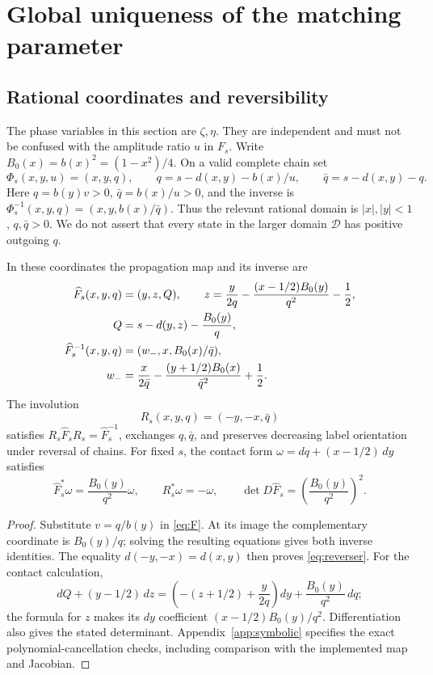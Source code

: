 \section{Global uniqueness of the matching parameter}\label{sec:uniqueness}
\subsection{Rational coordinates and reversibility}
The phase variables in this section are \(\zeta,\eta\). They are independent
and must not be confused with the amplitude ratio \(u\) in \(F_s\).
Write \(B_0(x)=b(x)^2=(1-x^2)/4\). On a valid complete chain set
\begin{equation}\label{eq:Phi}
 \Phi_s(x,y,u)=(x,y,q),\qquad
 q=s-d(x,y)-b(x)/u,\qquad \bar q=s-d(x,y)-q.
\end{equation}
Here \(q=b(y)v>0\), \(\bar q=b(x)/u>0\), and the inverse is
\(\Phi_s^{-1}(x,y,q)=(x,y,b(x)/\bar q)\).
Thus the relevant rational domain is \(|x|,|y|<1\), \(q,\bar q>0\).
We do not assert that every state in the larger domain \(\mathcal D\)
has positive outgoing \(q\).

\begin{lemma}\label{lem:rational}
In these coordinates the propagation map and its inverse are
\begin{align}
 \widehat F_s(x,y,q)&=(y,z,Q),\qquad
 z=\frac{y}{2q}-\frac{(x-1/2)B_0(y)}{q^2}-\frac12,\label{eq:Fhat}\\
 Q&=s-d(y,z)-\frac{B_0(y)}q,\notag\\
 \widehat F_s^{-1}(x,y,q)&=(w_-,x,B_0(x)/\bar q),\notag\\
 w_-&=\frac{x}{2\bar q}
       -\frac{(y+1/2)B_0(x)}{\bar q^2}+\frac12.\notag
\end{align}
The involution
\begin{equation}\label{eq:reverser}
 R_s(x,y,q)=(-y,-x,\bar q)
\end{equation}
satisfies \(R_s\widehat F_sR_s=\widehat F_s^{-1}\), exchanges \(q,\bar q\),
and preserves decreasing label orientation under reversal of chains.
For fixed \(s\), the contact form \(\omega=dq+(x-1/2)\,dy\) satisfies
\begin{equation}\label{eq:contact}
 \widehat F_s^*\omega=\frac{B_0(y)}{q^2}\omega,\qquad
 R_s^*\omega=-\omega,\qquad
 \det D\widehat F_s=\left(\frac{B_0(y)}{q^2}\right)^2.
\end{equation}
\end{lemma}
\begin{proof}
Substitute \(v=q/b(y)\) in \eqref{eq:F}. At its image the complementary
coordinate is \(B_0(y)/q\); solving the resulting equations gives both
inverse identities. The equality \(d(-y,-x)=d(x,y)\) then proves
\eqref{eq:reverser}. For the contact calculation,
\[
 dQ+(y-1/2)\,dz
 =\left(-(z+1/2)+\frac{y}{2q}\right)dy+\frac{B_0(y)}{q^2}\,dq;
\]
the formula for \(z\) makes its \(dy\) coefficient
\((x-1/2)B_0(y)/q^2\). Differentiation also gives the stated determinant.
Appendix~\ref{app:symbolic} specifies the exact polynomial-cancellation
checks, including comparison with the implemented map and Jacobian.
\end{proof}

